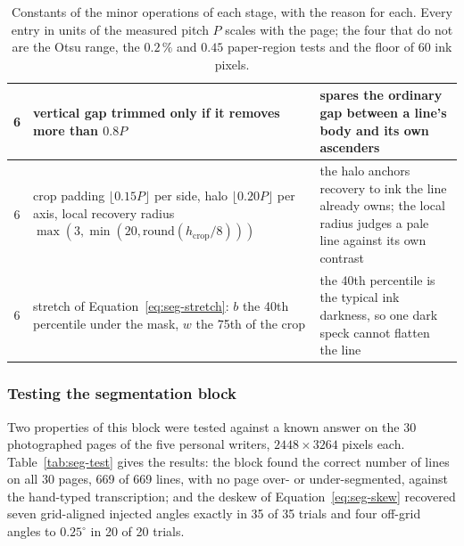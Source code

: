 \begin{table}[!htbp]
\begin{tabularx}{\linewidth}{|c|p{5.1cm}|X|}
\hline
6 & vertical gap trimmed only if it removes more than $0.8P$ & spares the ordinary gap between a line's body and its own ascenders \\
\hline
6 & crop padding $\lfloor0.15P\rfloor$ per side, halo $\lfloor0.20P\rfloor$ per axis, local recovery radius $\max(3,\min(20,\mathrm{round}(h_{\mathrm{crop}}/8)))$ & the halo anchors recovery to ink the line already owns; the local radius judges a pale line against its own contrast \\
\hline
6 & stretch of Equation~\ref{eq:seg-stretch}: $b$ the 40th percentile under the mask, $w$ the 75th of the crop & the 40th percentile is the typical ink darkness, so one dark speck cannot flatten the line \\
\hline
\end{tabularx}
\caption{Constants of the minor operations of each stage, with the reason for each. Every entry in units of the measured pitch $P$ scales with the page; the four that do not are the Otsu range, the $0.2\,\%$ and $0.45$ paper-region tests and the floor of 60 ink pixels.}
\label{tab:seg-const}
\end{table}

\subsubsection{Testing the segmentation block}
\label{sec:seg-test}

Two properties of this block were tested against a known answer on the 30 photographed pages of the five personal writers, $2448\times3264$ pixels each. Table~\ref{tab:seg-test} gives the results: the block found the correct number of lines on all 30 pages, 669 of 669 lines, with no page over- or under-segmented, against the hand-typed transcription; and the deskew of Equation~\ref{eq:seg-skew} recovered seven grid-aligned injected angles exactly in 35 of 35 trials and four off-grid angles to $0.25^\circ$ in 20 of 20 trials.

